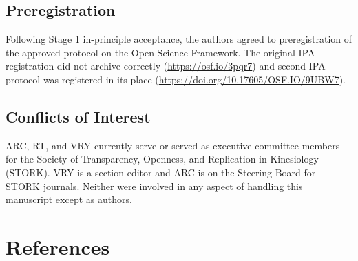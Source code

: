 \documentclass[]{cik}%
\begin{document}
\hypertarget{preregistration}{%
\subsection{Preregistration}\label{preregistration}}

Following Stage 1 in-principle acceptance, the authors agreed to
preregistration of the approved protocol on the Open Science Framework.
The original IPA registration did not archive correctly
(\url{https://osf.io/3pqr7}) and second IPA protocol was registered in
its place (\url{https://doi.org/10.17605/OSF.IO/9UBW7}).

\hypertarget{conflicts-of-interest}{%
\subsection{Conflicts of Interest}\label{conflicts-of-interest}}

ARC, RT, and VRY currently serve or served as executive committee
members for the Society of Transparency, Openness, and Replication in
Kinesiology (STORK). VRY is a section editor and ARC is on the Steering
Board for STORK journals. Neither were involved in any aspect of
handling this manuscript except as authors.

\newpage

\hypertarget{references}{%
\section{References}\label{references}}

\parindent0pt 
\setlength{\parskip}{1em}
\end{document}
